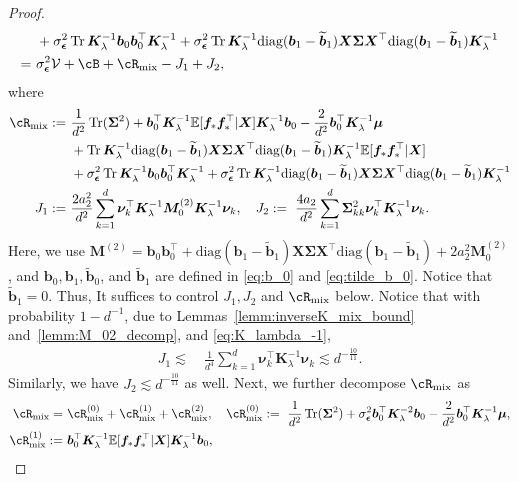 \documentclass[twoside,11pt]{article}
\newcommand{\bepsilon}{\boldsymbol{\epsilon}}
\newcommand{\E}{\mathbb{E}}
\newcommand{\diag}{\text{diag}}
\def\vf{{\boldsymbol f}}
\def\bK{{\boldsymbol K}}
\def\bX{{\boldsymbol X}}
\def\bM{{\boldsymbol M}}
\def\bb{{\boldsymbol b}}
\def\bSigma{{\boldsymbol \Sigma}}
\def\cV{{\mathcal V}}
\def\cV{{\mathcal V}}
\renewcommand{\bK}{\boldsymbol{K}}
\newcommand{\Tr}{\operatorname{Tr}}
\newcommand{\vmu}{\mbi{\mu}}
\newcommand{\vnu}{\mbi{\nu}}
\newcommand{\mix}{\textnormal{mix}}
\newcommand{\1}{\mathbf{1}}
\def\mbi#1{\boldsymbol{#1}}
\def\mbi#1{\boldsymbol{#1}} %
\begin{document}
\begin{proof}
\begin{align}
    ~& +\sigma^2_{\bepsilon}\Tr\bK_{\lambda}^{-1}\bb_0\bb_0^\top\bK_{\lambda}^{-1}+\sigma^2_{\bepsilon}\Tr\bK_{\lambda}^{-1}\diag(\bb_1-\widetilde\bb_1)\bX\bSigma\bX^\top\diag(\bb_1-\widetilde\bb_1)\bK_{\lambda}^{-1}\\
    =~& \sigma^2_{\bepsilon}\cV+\cB+\cR_{\mix}-J_1+J_2,
\end{align}
where
\begin{align}
\cR_{\mix}:=~& \frac{1}{d^2} \Tr(\bSigma^2)+ \bb_0^\top\bK_{\lambda}^{-1} \E[\vf_*\vf_*^\top|\bX]\bK_{\lambda}^{-1} \bb_0-\frac{2}{d^2}\bb_0^\top\bK_{\lambda}^{-1}\vmu\\
     ~& +\Tr\bK_{\lambda}^{-1}\diag(\bb_1-\widetilde\bb_1)\bX\bSigma\bX^\top\diag(\bb_1-\widetilde\bb_1) \bK_{\lambda}^{-1} \E[\vf_*\vf_*^\top|\bX] \\
    ~& +\sigma^2_{\bepsilon}\Tr\bK_{\lambda}^{-1}\bb_0\bb_0^\top\bK_{\lambda}^{-1}+\sigma^2_{\bepsilon}\Tr\bK_{\lambda}^{-1}\diag(\bb_1-\widetilde\bb_1)\bX\bSigma\bX^\top\diag(\bb_1-\widetilde\bb_1)\bK_{\lambda}^{-1}\\
    J_1:=~& \frac{2a_2^2}{d^2}\sum_{k=1}^d\vnu_k^\top\bK_{\lambda}^{-1}\bM_0^{(2)}\bK_{\lambda}^{-1}\vnu_k, \quad 
    J_2:=~ \frac{4a_2}{d^2}\sum_{k=1}^d\bSigma_{kk}^2\vnu_k^\top\bK_{\lambda}^{-1}\vnu_k.
\end{align}
Here, we use $\bM^{(2)}=\bb_0\bb_0^\top+ \diag(\bb_1-\widetilde\bb_1)\bX\bSigma\bX^\top\diag(\bb_1-\widetilde\bb_1) +2a_2^2\bM_0^{(2)}$, and $\bb_0,\bb_1,\widetilde\bb_0$, and $\widetilde\bb_1$ are defined in \eqref{eq:b_0} and \eqref{eq:tilde_b_0}. Notice that $\widetilde\bb_1=0$. Thus, It suffices to control $J_1,J_2$ and $\cR_{\mix}$ below. Notice that with probability  $1-d^{-1}$,  due to Lemmas~\ref{lemm:inverseK_mix_bound} and~\ref{lemm:M_02_decomp}, and \eqref{eq:K_lambda_-1},
\begin{align}
J_1\lesssim ~&  \frac{1}{d^4}\sum_{k=1}^d\vnu_k^\top\bK_{\lambda}^{-1} \vnu_k\lesssim d^{-\frac{10}{11}}.
\end{align}  Similarly, we have $J_2\lesssim d^{-\frac{10}{11}}$ as well. Next, we further decompose $\cR_{\mix}$ as 
\begin{align}
\cR_{\mix}=~&\cR_{\mix}^{(0)}+\cR_{\mix}^{(1)}+\cR_{\mix}^{(2)}, \quad 
    \cR_{\mix}^{(0)}:=~\frac{1}{d^2} \Tr(\bSigma^2)+ \sigma^2_{\bepsilon} \bb_0^\top\bK_{\lambda}^{-2}\bb_0-\frac{2}{d^2}\bb_0^\top\bK_{\lambda}^{-1}\vmu,\\
    \cR_{\mix}^{(1)}:=~& \bb_0^\top\bK_{\lambda}^{-1} \E[\vf_*\vf_*^\top|\bX]\bK_{\lambda}^{-1} \bb_0,\\

\end{align}
\end{proof}
\end{document}
